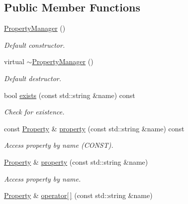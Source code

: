 \subsection*{Public Member Functions}
\begin{DoxyCompactItemize}
\item 
\hyperlink{class_d_d4hep_1_1_property_manager_a3b65b75bae28db832e98a38aec5774c6}{PropertyManager} ()
\begin{DoxyCompactList}\small\item\em Default constructor. \item\end{DoxyCompactList}\item 
virtual \hyperlink{class_d_d4hep_1_1_property_manager_aa16d7f0cb2a2baaa3b3afbe6239aac39}{$\sim$PropertyManager} ()
\begin{DoxyCompactList}\small\item\em Default destructor. \item\end{DoxyCompactList}\item 
bool \hyperlink{class_d_d4hep_1_1_property_manager_a148a4782a23d9dcbede328256a0e9a04}{exists} (const std::string \&name) const 
\begin{DoxyCompactList}\small\item\em Check for existence. \item\end{DoxyCompactList}\item 
const \hyperlink{class_d_d4hep_1_1_property}{Property} \& \hyperlink{class_d_d4hep_1_1_property_manager_a03ee7ad7c55e62d4185863d9cad797ac}{property} (const std::string \&name) const 
\begin{DoxyCompactList}\small\item\em Access property by name (CONST). \item\end{DoxyCompactList}\item 
\hyperlink{class_d_d4hep_1_1_property}{Property} \& \hyperlink{class_d_d4hep_1_1_property_manager_a801b559283e0815c2172ec832bb3adff}{property} (const std::string \&name)
\begin{DoxyCompactList}\small\item\em Access property by name. \item\end{DoxyCompactList}\item 
\hyperlink{class_d_d4hep_1_1_property}{Property} \& \hyperlink{class_d_d4hep_1_1_property_manager_a808cecf05d76d3af17553e227130255e}{operator\mbox{[}$\,$\mbox{]}} (const std::string \&name)

\end{DoxyCompactItemize}
